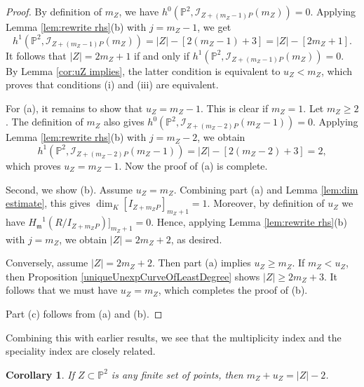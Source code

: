 \documentclass[12pt]{amsart}
\numberwithin{equation}{section}
\newtheorem{corollary}[theorem]{Corollary}
\theoremstyle{definition}
\begin{document}
\begin{proof}
By definition of $m_Z$, we have $h^0({ \ensuremath{\mathbb{P}}}^2,\mathcal I_{Z+(m_Z - 1) P}(m_Z)) = 0$. Applying Lemma \ref{lem:rewrite rhs}(b) with $j = m_Z-1$, we get 
\[
h^1({ \ensuremath{\mathbb{P}}}^2,\mathcal I_{Z+(m_Z - 1) P}(m_Z)) = |Z| - [2(m_Z -1) + 3]= |Z| - [2m_Z + 1].  
\]
It follows that $|Z| = 2 m_Z + 1$ if and only if $h^1({ \ensuremath{\mathbb{P}}}^2,\mathcal I_{Z+(m_Z - 1) P}(m_Z)) = 0$. By Lemma \ref{cor:uZ implies}, the latter condition is equivalent to $u_Z < m_Z$, which proves that conditions (i) and (iii) are equivalent. 

For (a), it remains to show that $u_Z = m_Z - 1$. This is clear if $m_Z = 1$. Let $m_Z \ge 2$. 
The definition of $m_Z$ also gives $h^0({ \ensuremath{\mathbb{P}}}^2,\mathcal I_{Z+(m_Z - 2) P}(m_Z -1)) = 0$. Applying Lemma \ref{lem:rewrite rhs}(b) with $j = m_Z -2$, we obtain
\[
h^1({ \ensuremath{\mathbb{P}}}^2,\mathcal I_{Z+(m_Z - 2) P}(m_Z -1)) = |Z| - [2(m_Z -2) + 3] = 2, 
\]
which proves $u_Z = m_Z -1$. Now the proof of (a) is complete. 

Second, we show (b). Assume $u_Z = m_Z$. Combining part (a) and Lemma \ref{lem:dim estimate}, this gives $\dim_K [I_{Z + m_Z P}]_{m_Z + 1} = 1$. Moreover, by definition of $u_Z$ we have ${H_{\mathfrak m}}^1 (R/I_{Z + m_Z P})]_{m_Z + 1} = 0$. Hence, applying Lemma \ref{lem:rewrite rhs}(b) with $j = m_Z$, we obtain $|Z| = 2 m_Z + 2$, as desired. 

Conversely, assume $|Z| = 2 m_Z + 2$. Then part (a) implies $u_Z \ge m_Z$. If $m_Z <  u_Z$, then Proposition \ref{uniqueUnexpCurveOfLeastDegree}
 shows  $|Z| \ge  2 m_Z + 3$. It follows that we must have $u_Z = m_Z$, which completes the proof of (b). 

Part (c) follows from (a) and (b). 
\end{proof} 

Combining this with earlier results, we see that the multiplicity index and the speciality index are closely related. 

\begin{corollary}
   \label{cor:uZ}
If $Z \subset \mathbb P^2$ is any finite set of points, then $m_Z + u_Z = |Z| - 2$.    
\end{corollary}
\end{document}
